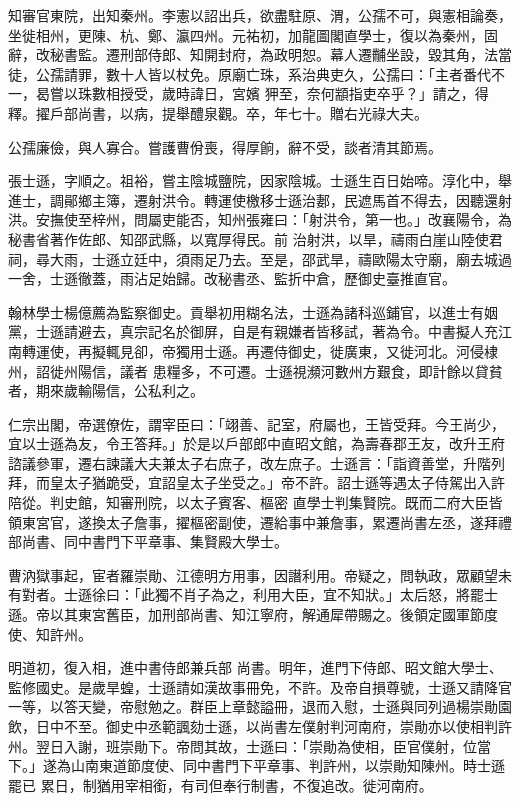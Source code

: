 \begin{pinyinscope}
 知審官東院，出知秦州。李憲以詔出兵，欲盡駐原、渭，公孺不可，與憲相論奏，坐徙相州，更陳、杭、鄭、瀛四州。元祐初，加龍圖閣直學士，復以為秦州，固辭，改秘書監。遷刑部侍郎、知開封府，為政明恕。幕人遷黼坐設，毀其角，法當徒，公孺請罪，數十人皆以杖免。原廟亡珠，系治典吏久，公孺曰：「主者番代不一，曷嘗以珠數相授受，歲時諱日，宮嬪
 狎至，奈何顓指吏卒乎？」請之，得釋。擢戶部尚書，以病，提舉醴泉觀。卒，年七十。贈右光祿大夫。



 公孺廉儉，與人寡合。嘗護曹佾喪，得厚餉，辭不受，談者清其節焉。



 張士遜，字順之。祖裕，嘗主陰城鹽院，因家陰城。士遜生百日始啼。淳化中，舉進士，調鄖鄉主簿，遷射洪令。轉運使檄移士遜治郪，民遮馬首不得去，因聽還射洪。安撫使至梓州，問屬吏能否，知州張雍曰：「射洪令，第一也。」改襄陽令，為秘書省著作佐郎、知邵武縣，以寬厚得民。前
 治射洪，以旱，禱雨白崖山陸使君祠，尋大雨，士遜立廷中，須雨足乃去。至是，邵武旱，禱歐陽太守廟，廟去城過一舍，士遜徹蓋，雨沾足始歸。改秘書丞、監折中倉，歷御史臺推直官。



 翰林學士楊億薦為監察御史。貢舉初用糊名法，士遜為諸科巡鋪官，以進士有姻黨，士遜請避去，真宗記名於御屏，自是有親嫌者皆移試，著為令。中書擬人充江南轉運使，再擬輒見卻，帝獨用士遜。再遷侍御史，徙廣東，又徙河北。河侵棣州，詔徙州陽信，議者
 患糧多，不可遷。士遜視瀕河數州方艱食，即計餘以貸貧者，期來歲輸陽信，公私利之。



 仁宗出閣，帝選僚佐，謂宰臣曰：「翊善、記室，府屬也，王皆受拜。今王尚少，宜以士遜為友，令王答拜。」於是以戶部郎中直昭文館，為壽春郡王友，改升王府諮議參軍，遷右諫議大夫兼太子右庶子，改左庶子。士遜言：「詣資善堂，升階列拜，而皇太子猶跪受，宜詔皇太子坐受之。」帝不許。詔士遜等遇太子侍駕出入許陪從。判史館，知審刑院，以太子賓客、樞密
 直學士判集賢院。既而二府大臣皆領東宮官，遂換太子詹事，擢樞密副使，遷給事中兼詹事，累遷尚書左丞，遂拜禮部尚書、同中書門下平章事、集賢殿大學士。



 曹汭獄事起，宦者羅崇勛、江德明方用事，因譖利用。帝疑之，問執政，眾顧望未有對者。士遜徐曰：「此獨不肖子為之，利用大臣，宜不知狀。」太后怒，將罷士遜。帝以其東宮舊臣，加刑部尚書、知江寧府，解通犀帶賜之。後領定國軍節度使、知許州。



 明道初，復入相，進中書侍郎兼兵部
 尚書。明年，進門下侍郎、昭文館大學士、監修國史。是歲旱蝗，士遜請如漢故事冊免，不許。及帝自損尊號，士遜又請降官一等，以答天變，帝慰勉之。群臣上章懿謚冊，退而入慰，士遜與同列過楊崇勛園飲，日中不至。御史中丞範諷劾士遜，以尚書左僕射判河南府，崇勛亦以使相判許州。翌日入謝，班崇勛下。帝問其故，士遜曰：「崇勛為使相，臣官僕射，位當下。」遂為山南東道節度使、同中書門下平章事、判許州，以崇勛知陳州。時士遜罷已
 累日，制猶用宰相銜，有司但奉行制書，不復追改。徙河南府。




\end{pinyinscope}
